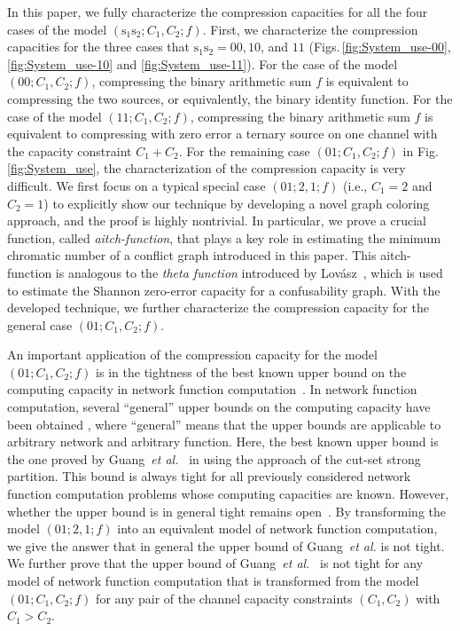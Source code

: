 \documentclass[11pt,draftclsnofoot,onecolumn]{IEEEtran}
\begin{document}
In this paper, we fully characterize the compression capacities for all the four cases of the model $(\boldsymbol{\mathrm{s}}_1\boldsymbol{\mathrm{s}}_2;C_{1}, C_{2};  f)$.  First, we characterize the compression capacities for the three cases that $\boldsymbol{\mathrm{s}}_1\boldsymbol{\mathrm{s}}_2=00,10$, and $11$ (Figs.\,\ref{fig:System_use-00}, \ref{fig:System_use-10} and \ref{fig:System_use-11}). For the case of the model $(00;C_1,C_2;f)$, compressing the binary arithmetic sum $f$ is equivalent to compressing the two sources, or equivalently, the binary identity function. For the case of the model $(11;C_1,C_2;f)$, compressing the binary arithmetic sum $f$ is equivalent to compressing with zero error a ternary source on one channel with the capacity constraint $C_1+C_2$. For the remaining case $(01;C_1,C_2;f)$ in Fig.\,\ref{fig:System_use}, the characterization of the compression capacity is very difficult. We first focus on a typical special case $(01;2,1;f)$ (i.e., $C_1=2$ and $C_2=1$) to explicitly show our technique by developing a novel graph coloring approach, and the proof is highly nontrivial.
In particular, we prove a crucial function, called \emph{aitch-function}, that plays a key role in estimating the minimum chromatic number of a conflict graph introduced in this paper. This aitch-function is analogous to the \emph{theta function} introduced by Lov\'{a}sz~\cite{Lovasz_shannon_cap_graph}, which is used to estimate the  Shannon zero-error capacity for a confusability graph. With the developed technique, we further characterize the compression capacity for the general case $(01;C_1,C_2;f)$.


An important application of the compression capacity for the model $(01;C_1,C_2;f)$ is in the tightness of the best known upper bound on the computing capacity in  network function computation~\cite{Guang_Improved_upper_bound}. In network function computation, several ``general'' upper bounds on the computing capacity have been obtained \cite{Appuswamy11,Huang_Comment_cut_set_bound,Guang_Improved_upper_bound}, where ``general'' means that the upper bounds are applicable to arbitrary network and arbitrary  function. Here, the best known upper bound is the one proved by Guang~\emph{et al.}~\cite{Guang_Improved_upper_bound} in using the approach of the cut-set strong partition. This bound is always tight for all previously considered network function computation problems whose computing capacities are known. However, whether the upper bound is in general tight remains open~\cite{Guang_Improved_upper_bound}. By transforming the model $(01;2,1;f)$ into an equivalent model of network function computation, we give the answer that in general the upper bound of Guang~\emph{et al.} is not tight. We further prove that the upper bound of Guang~\emph{et al.}~\cite{Guang_Improved_upper_bound} is not tight for any model of network function computation that is transformed from the model $(01;C_1,C_2;f)$ for any pair of the channel capacity constraints $(C_1,C_2)$ with $C_1>C_2$.
\end{document}
